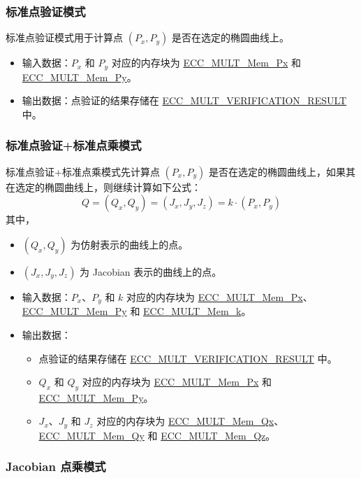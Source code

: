 \documentclass[main\_\_CN.tex]{subfiles}
\begin{document}
\subsubsection{标准点验证模式}

标准点验证模式用于计算点 $(P_x, P_y)$ 是否在选定的椭圆曲线上。

\begin{itemize}
    \item 输入数据：$P_x$ 和 $P_y$ 对应的内存块为 \hyperref[tab:ecc-memory]{ECC\_MULT\_Mem\_Px} 和 \hyperref[tab:ecc-memory]{ECC\_MULT\_Mem\_Py}。
    \item 输出数据：点验证的结果存储在 \hyperref[fielddesc:ECCMULTVERIFICATIONRESULT]{ECC\_MULT\_VERIFICATION\_RESULT} 中。
\end{itemize}

\subsubsection{标准点验证+标准点乘模式}

标准点验证+标准点乘模式先计算点 $(P_x,P_y)$ 是否在选定的椭圆曲线上，如果其在选定的椭圆曲线上，则继续计算如下公式：
\[
Q = (Q_x,Q_y) = (J_x,J_y,J_z) = k \cdot (P_x,P_y)
\]
其中，
\begin{itemize}
    \item $(Q_x,Q_y)$ 为仿射表示的曲线上的点。
    \item $(J_x,J_y,J_z)$ 为 Jacobian 表示的曲线上的点。
    \item 输入数据：$P_x$、$P_y$ 和 $k$ 对应的内存块为 \hyperref[tab:ecc-memory]{ECC\_MULT\_Mem\_Px}、\hyperref[tab:ecc-memory]{ECC\_MULT\_Mem\_Py} 和 \hyperref[tab:ecc-memory]{ECC\_MULT\_Mem\_k}。
    \item 输出数据：
    \begin{itemize}
        \item 点验证的结果存储在 \hyperref[fielddesc:ECCMULTVERIFICATIONRESULT]{ECC\_MULT\_VERIFICATION\_RESULT} 中。
        \item $Q_x$ 和 $Q_y$ 对应的内存块为 \hyperref[tab:ecc-memory]{ECC\_MULT\_Mem\_Px} 和 \hyperref[tab:ecc-memory]{ECC\_MULT\_Mem\_Py}。
        \item $J_x$、$J_y$ 和 $J_z$ 对应的内存块为 \hyperref[tab:ecc-memory]{ECC\_MULT\_Mem\_Qx}、\hyperref[tab:ecc-memory]{ECC\_MULT\_Mem\_Qy} 和 \hyperref[tab:ecc-memory]{ECC\_MULT\_Mem\_Qz}。
    \end{itemize}
\end{itemize}

\subsubsection{Jacobian 点乘模式}
\end{document}
